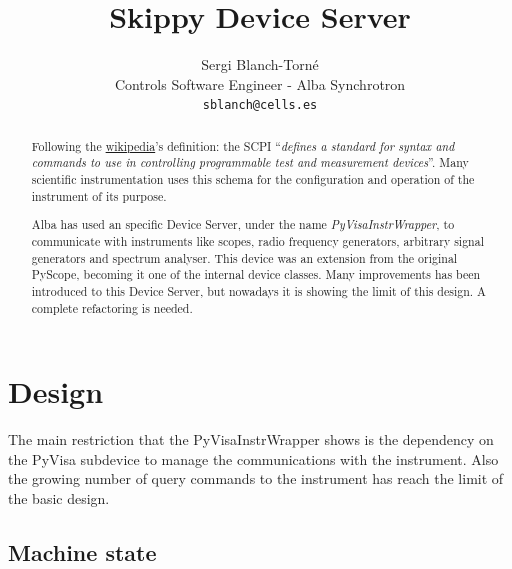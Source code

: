 \documentclass[a4paper,10pt]{article}
\title{Skippy Device Server}
\author{Sergi Blanch-Torn\'e\\\small{Controls Software Engineer - Alba Synchrotron}\\{\tt \small{sblanch@cells.es}}}
\begin{document}
\maketitle

\begin{abstract}
Following the \href{https://en.wikipedia.org/wiki/Standard_Commands_for_Programmable_Instruments}{wikipedia}'s definition:  the SCPI ``\emph{defines a standard for syntax and commands to use in controlling programmable test and measurement devices}''. Many scientific instrumentation uses this schema for the configuration and operation of the instrument of its purpose.

Alba has used an specific Device Server, under the name \emph{PyVisaInstrWrapper}, to communicate with instruments like scopes, radio frequency generators, arbitrary signal generators and spectrum analyser. This device was an extension from the original PyScope, becoming it one of the internal device classes. Many improvements has been introduced to this Device Server, but nowadays it is showing the limit of this design. A complete refactoring is needed.
\end{abstract}

\section{Design}

The main restriction that the PyVisaInstrWrapper shows is the dependency on the PyVisa subdevice to manage the communications with the instrument. Also the growing number of query commands to the instrument has reach the limit of the basic design.

\subsection{Machine state}

\begin{figure}[h]
\end{figure}
\end{document}
